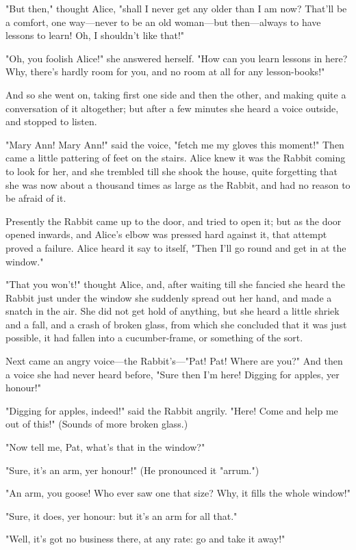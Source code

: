 "But then," thought Alice, "shall I never get any older than I am now? That'll be a comfort, one way—never to be an old woman—but then—always to have lessons to learn! Oh, I shouldn't like that!"

"Oh, you foolish Alice!" she answered ​herself. "How can you learn lessons in here? Why, there's hardly room for you, and no room at all for any lesson-books!"

And so she went on, taking first one side and then the other, and making quite a conversation of it altogether; but after a few minutes she heard a voice outside, and stopped to listen.

"Mary Ann! Mary Ann!" said the voice, "fetch me my gloves this moment!" Then came a little pattering of feet on the stairs. Alice knew it was the Rabbit coming to look for her, and she trembled till she shook the house, quite forgetting that she was now about a thousand times as large as the Rabbit, and had no reason to be afraid of it.

Presently the Rabbit came up to the door, and tried to open it; but as the door opened inwards, and Alice's elbow was pressed hard against it, that attempt proved a failure. Alice heard it say to itself, "Then I'll go round and get in at the window."

"That you won't!" thought Alice, and, after ​waiting till she fancied she heard the Rabbit just under the window she suddenly spread out her hand, and made a snatch in the air. She did not get hold of anything, but she heard a little shriek and a fall, and a crash of broken glass, from which she concluded that it was just possible, it had fallen into a cucumber-frame, or something of the sort.

Next came an angry voice—the Rabbit's—"Pat! Pat! Where are you?" And then a voice she had never heard before, "Sure then I'm here! Digging for apples, yer honour!"

"Digging for apples, indeed!" said the Rabbit angrily. "Here! Come and help me out of this!" (Sounds of more broken glass.)

​"Now tell me, Pat, what's that in the window?"

"Sure, it's an arm, yer honour!" (He pronounced it "arrum.")

"An arm, you goose! Who ever saw one that size? Why, it fills the whole window!"

"Sure, it does, yer honour: but it's an arm for all that."

"Well, it's got no business there, at any rate: go and take it away!"

